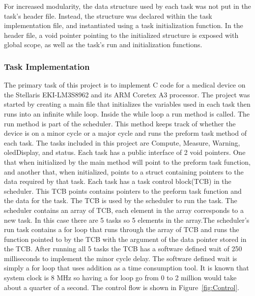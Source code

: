 \documentclass[12pt]{article} %
\begin{document}
    For increased modularity, the data structure used by each task was not put in
    the task's header file. Instead, the structure was declared within the task
    implementation file, and instantiated using a task initialization function. In
    the header file, a void pointer pointing to the initialized structure is
    exposed with global scope, as well as the task's run and initialization functions.

    \subsubsection{Task Implementation}

    The primary task of this project is to implement C code for a medical device on
    the Stellaris EKI-LM3S8962 and its ARM Coretex A3 processor. The project was
    started by creating a main file that initializes the variables used in each
    task then runs into an infinite while loop. Inside the while loop a run method
    is called. The run method is part of the scheduler. This method keeps track of
    whether the device is on a minor cycle or a major cycle and runs the preform
    task method of each task. The tasks included in this project are Compute,
    Measure, Warning, oledDisplay, and status. Each task has a public interface of
    2 void pointers. One that when initialized by the main method will point to the
    preform task function, and another that, when initialized, points to a struct
    containing pointers to the data required by that task. Each task has a task
    control block(TCB) in the scheduler. This TCB points contains pointers to the
    preform task function and the data for the task. The TCB is used by the
    scheduler to run the task. The scheduler contains an array of TCB, each element
    in the array corresponds to a new task. In this case there are 5 tasks so 5
    elements in the array.The scheduler's run task contains a for loop that runs
    through the array of TCB and runs the function pointed to by the TCB with the
    argument of the data pointer stored in the TCB. After running all 5 tasks the
    TCB has a software defined wait of 250 milliseconds to implement the minor
    cycle delay. The software defined wait is simply a for loop that uses addition
    as a time consumption tool. It is known that system clock is 8 MHz so having a
    for loop go from 0 to 2 million would take about a quarter of a second. The
    control flow is shown in Figure~\ref{fig:Control}. 
\end{document}
